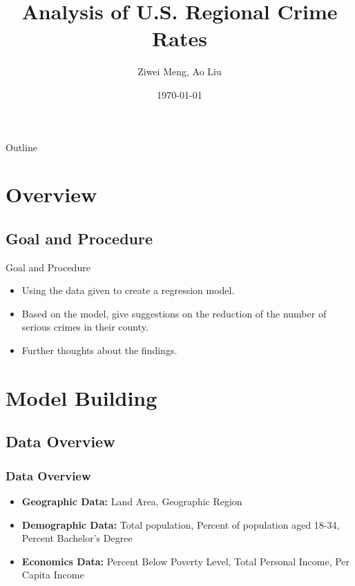 \documentclass{beamer}
\title[Columbia University]{Analysis of U.S. Regional Crime Rates}
\author{Ziwei Meng, Ao Liu}
\date{\today}
\begin{document}
\begin{frame}
  \titlepage
\end{frame}

\begin{frame}{Outline}
  \tableofcontents
\end{frame}
\section{Overview}
\subsection{Goal and Procedure}
\begin{frame}{Goal and Procedure}
\begin{itemize}
\item Using the data given to create a regression model.
\item Based on the model, give suggestions on the reduction of the number of serious crimes in their county.
\item Further thoughts about the findings.
\end{itemize}
\end{frame}


\section{Model Building}
\subsection{Data Overview}
\begin{frame}[fragile]
\frametitle{Data Overview}
\begin{itemize}
\item \textbf{Geographic Data:} Land Area, Geographic Region
\item \textbf{Demographic Data:} Total population, Percent of population aged 18-34, Percent Bachelor’s Degree
\item \textbf{Economics Data:} Percent Below Poverty Level, Total Personal Income, Per Capita Income
\end{itemize}
\end{frame}
\end{document}
